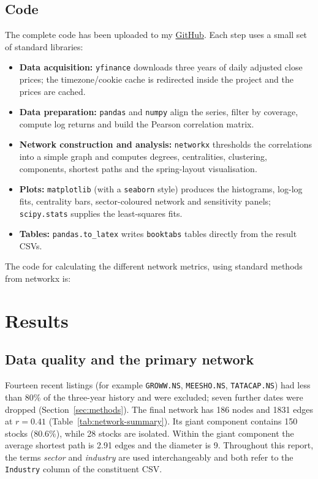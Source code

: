\documentclass[11pt,a4paper]{article}
\begin{document}
\subsection{Code}
The complete code has been uploaded to my \href{https://github.com/soododivyam/ECS414}{GitHub}. Each step uses a small set of standard libraries:


\begin{itemize}
  \item \textbf{Data acquisition:} \texttt{yfinance} downloads three years of daily adjusted close prices; the timezone/cookie cache is redirected inside the project and the prices are cached.
  \item \textbf{Data preparation:} \texttt{pandas} and \texttt{numpy} align the series, filter by coverage, compute log returns and build the Pearson correlation matrix.
  \item \textbf{Network construction and analysis:} \texttt{networkx} thresholds the correlations into a simple graph and computes degrees, centralities, clustering, components, shortest paths and the spring-layout visualisation.
  \item \textbf{Plots:} \texttt{matplotlib} (with a \texttt{seaborn} style) produces the histograms, log-log fits, centrality bars, sector-coloured network and sensitivity panels; \texttt{scipy.stats} supplies the least-squares fits.
  \item \textbf{Tables:} \texttt{pandas.to\_latex} writes \texttt{booktabs} tables directly from the result CSVs.
\end{itemize}

% 

% 

The code for calculating the different network metrics, using standard methods from networkx is:



% 

\section{Results}
\label{sec:results}

\subsection{Data quality and the primary network}
Fourteen recent listings (for
example \texttt{GROWW.NS}, \texttt{MEESHO.NS}, \texttt{TATACAP.NS}) had less
than $80\%$ of the three-year history and were excluded; seven further dates
were dropped (Section~\ref{sec:methods}). The final network has 186 nodes and 1831
edges at $r=0.41$ (Table~\ref{tab:network-summary}). Its giant component
contains 150 stocks ($80.6\%$), while 28 stocks are isolated. Within the giant
component the average shortest path is 2.91 edges and the diameter is 9. Throughout this report, the terms \emph{sector} and \emph{industry} are used
interchangeably and both refer to the \texttt{Industry} column of the
constituent CSV.
\end{document}
